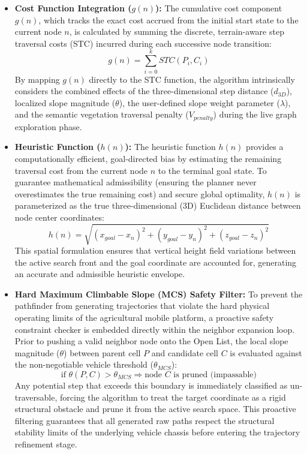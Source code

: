 \begin{itemize}
    \item \textbf{Cost Function Integration ($g(n)$):} The cumulative cost component $g(n)$, which tracks the exact cost accrued from the initial start state to the current node $n$, is calculated by summing the discrete, terrain-aware step traversal costs (STC) incurred during each successive node transition:
    \begin{equation}
        g(n) = \sum_{i=0}^{k} STC(P_i, C_i)
    \end{equation}
    By mapping $g(n)$ directly to the STC function, the algorithm intrinsically considers the
combined effects of the three-dimensional step distance ($d_{3D}$), localized slope magnitude
($\theta$), the user-defined slope weight parameter ($\lambda$), and the semantic vegetation
traversal penalty ($V_{penalty}$) during the live graph exploration phase.

    \item \textbf{Heuristic Function ($h(n)$):} The heuristic function $h(n)$ provides a computationally efficient, goal-directed bias by estimating the remaining traversal cost from the current node $n$ to the terminal goal state. To guarantee mathematical admissibility (ensuring the planner never overestimates the true remaining cost) and secure global optimality, $h(n)$ is parameterized as the true three-dimensional (3D) Euclidean distance between node center coordinates:
    \begin{equation}
        h(n) = \sqrt{(x_{goal} - x_n)^2 + (y_{goal} - y_n)^2 + (z_{goal} - z_n)^2}
    \end{equation}
    This spatial formulation ensures that vertical height field variations between the active search
front and the goal coordinate are accounted for, generating an accurate and admissible heuristic
envelope.

    \item \textbf{Hard Maximum Climbable Slope (MCS) Safety Filter:} To prevent the pathfinder from generating trajectories that violate the hard physical operating limits of the agricultural mobile platform, a proactive safety constraint checker is embedded directly within the neighbor expansion loop. Prior to pushing a valid neighbor node onto the Open List, the local slope magnitude ($\theta$) between parent cell $P$ and candidate cell $C$ is evaluated against the non-negotiable vehicle threshold ($\theta_{MCS}$):
    \begin{equation}
        \text{if } \theta(P, C) > \theta_{MCS} \Rightarrow \text{node } C \text{ is pruned (impassable)}
    \end{equation}
    Any potential step that exceeds this boundary is immediately classified as un-traversable,
forcing the algorithm to treat the target coordinate as a rigid structural obstacle and prune it
from the active search space. This proactive filtering guarantees that all generated raw paths
respect the structural stability limits of the underlying vehicle chassis before entering the
trajectory refinement stage.
\end{itemize}

